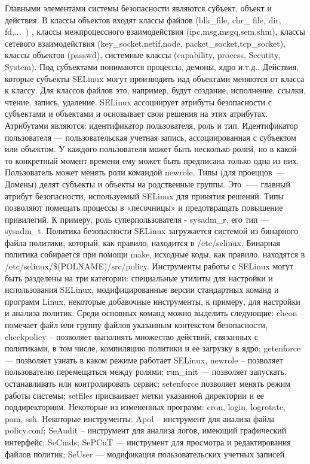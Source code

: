 Главными элементами системы безопасности 
являются субъект, объект и действия. В классы 
объектов входят классы файлов (blk\_file, chr\_
file, dir, fd,...\ ) ,  классы межпроцессного 
взаимодействия (ipc,msg,msgq,sem,shm), классы 
сетевого взаимодействия (key\_socket,netif,node,
packet\_socket,tcp\_socket), классы объектов 
(passwd), системные классы (capability, process,
Secutity, System). Под субъектами понимаются 
процессы, демоны, ядро и.т.д.. Действия, которые субъекты 
SELinux могут производить над объектами меняются
от класса к классу. Для классов файлов это, например, 
будут создание, исполнение, ссылки, чтение, запись, 
удаление. SELinux ассоциирует атрибуты безопасности 
с субъектами и объектами и основывает свои решения 
на этих атрибутах. Атрибутами являются: идентификатор 
пользователя, роль и тип. Идентификатор пользователя 
— пользовательская учетная запись, ассоциированная с 
субъектом или объектом. У каждого пользователя может 
быть несколько ролей, но в какой-то конкретный момент
времени ему может быть предписана только одна из них. 
Пользователь может менять роли командой newrole. Типы 
(для проеццов~--- Домены) делят субъекты и объекты на родственные 
группы. Это~--— главный атрибут безопасности, используемый 
SELinux для принятия решений. Типы позволяют помещать 
процессы в «песочницы» и предотвращать повышение 
привилегий. К примеру, роль суперпользователя - 
sysadm\_r, его тип — sysadm\_t. Политика безопасности 
SELinux загружается системой из бинарного файла политики,
который, как правило, находится в /etc/selinux. 
Бинарная политика собирается при помощи make, исходные 
коды, как правило, находятся в /etc/selinux/\$(POLNAME)/src/policy.
Инструменты работы с SELinux могут быть разделены на 
три категории: специальные утилиты для настройки и 
использования SELinux, модифицированные версии стандартных 
команд и программ Linux, некоторые добавочные инструменты,
к примеру, для настройки и анализа политик. Среди основных 
команд можно выделить следующие: chcon – помечает файл или 
группу файлов указанным контекстом безопасности, checkpolicy
– позволяет выполнять множество действий, связанных с 
политиками, в том числе, компиляцию политики и ее загрузку 
в ядро; getenforce — позволяет узнать в каком режиме 
работает SELinux, newrole – позволяет пользователю 
перемещаться между ролями; run\_init — позволяет 
запускать, останавливать или контролировать сервис; 
setenforce позволяет менять режим работы системы; 
setfiles присваивает метки указанной директории и ее 
поддиректориям. Некоторые из измененных программ: cron, 
login, logrotate, pam, ssh. Некоторые инструменты: Apol 
– инструмент для анализа файла policy.conf; SeAudit – 
инструмент для анализа логов, имеющий графический интерфейс; 
SeCmds; SePCuT — инструмент для просмотра и редактирования 
файлов политик; SeUser — модификация пользовательских 
учетных записей. 

